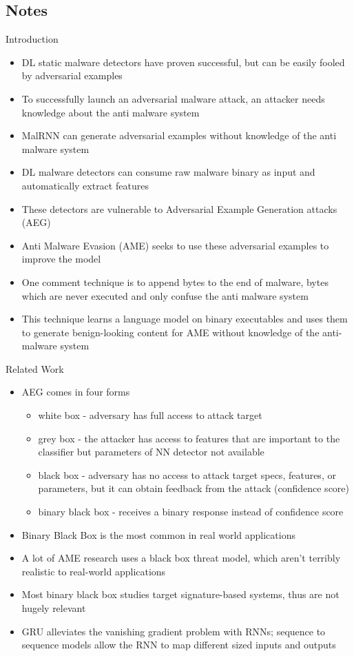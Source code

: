 \documentclass{article}
\begin{document}
\subsection*{Notes}

Introduction
\begin{itemize}
\item DL static malware detectors have proven successful, but can be easily fooled by adversarial examples
\item To successfully launch an adversarial malware attack, an attacker needs knowledge about the anti malware system
\item MalRNN can generate adversarial examples without knowledge of the anti malware system
\item DL malware detectors can consume raw malware binary as input and automatically extract features
\item These detectors are vulnerable to Adversarial Example Generation attacks (AEG)
\item Anti Malware Evasion (AME) seeks to use these adversarial examples to improve the model
\item One comment technique is to append bytes to the end of malware, bytes which are never executed and only confuse the anti malware system
\item This technique learns a language model on binary executables and uses them to generate benign-looking content for AME without knowledge of the anti-malware system
\end{itemize}
Related Work
\begin{itemize}
\item AEG comes in four forms
	\begin{itemize}
	\item white box - adversary has full access to attack target
	\item grey box - the attacker has access to features that are important to the classifier but parameters of NN detector not available
	\item black box - adversary has no access to attack target specs, features, or parameters, but it can obtain feedback from the attack (confidence score)
	\item binary black box - receives a binary response instead of confidence score
	\end{itemize}
\item Binary Black Box is the most common in real world applications
\item A lot of AME research uses a black box threat model, which aren't terribly realistic to real-world applications
\item Most binary black box studies target signature-based systems, thus are not hugely relevant
\item GRU alleviates the vanishing gradient problem with RNNs; sequence to sequence models allow the RNN to map different sized inputs and outputs
\end{itemize}
\end{document}
